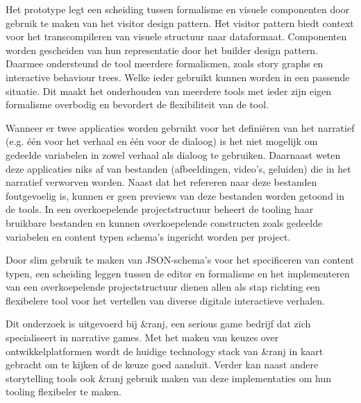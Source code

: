 Het prototype legt een scheiding tussen formalisme en visuele componenten door gebruik te maken van het visitor design pattern. Het visitor pattern biedt context voor het transcompileren van visuele structuur naar dataformaat. Componenten worden gescheiden van hun representatie door het builder design pattern. Daarmee ondersteund de tool meerdere formalismen, zoals story graphs en interactive behaviour trees. Welke ieder gebruikt kunnen worden in een passende situatie. Dit maakt het onderhouden van meerdere tools met ieder zijn eigen formalisme overbodig en bevordert de flexibiliteit van de tool.

Wanneer er twee applicaties worden gebruikt voor het definiëren van het narratief (e.g. één voor het verhaal en één voor de dialoog) is het niet mogelijk om gedeelde variabelen in zowel verhaal als dialoog te gebruiken. Daarnaast weten deze applicaties niks af van bestanden (afbeeldingen, video's, geluiden) die in het narratief verworven worden. Naast dat het refereren naar deze bestanden foutgevoelig is, kunnen er geen previews van deze bestanden worden getoond in de tools. In een overkoepelende projectstructuur beheert de tooling haar bruikbare bestanden en kunnen overkoepelende constructen zoals gedeelde variabelen en content typen schema's ingericht worden per project.


Door slim gebruik te maken van JSON-schema’s voor het specificeren van content typen, een scheiding leggen tussen de editor en formalisme en het implementeren van een overkoepelende projectstructuur dienen allen als stap richting een flexibelere tool voor het vertellen van diverse digitale interactieve verhalen.

Dit onderzoek is uitgevoerd bij \&ranj, een serious game bedrijf dat zich specialiseert in narrative games. Met het maken van keuzes over ontwikkelplatformen wordt de huidige technology stack van \&ranj in kaart gebracht om te kijken of de keuze goed aansluit. Verder kan naast andere storytelling tools ook \&ranj gebruik maken van deze implementaties om hun tooling flexibeler te maken.